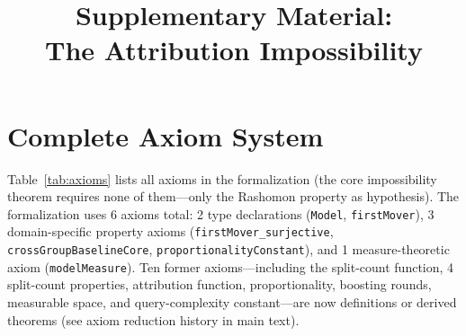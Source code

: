 \documentclass{article}
\title{Supplementary Material:\\The Attribution Impossibility}
\author{}
\date{}
\begin{document}
\maketitle

\setcounter{theorem}{5}    %
\setcounter{axiom}{1}      %
\setcounter{figure}{2}     %
\setcounter{table}{4}      %

\tableofcontents
\newpage

\section{Complete Axiom System}

\begin{sloppypar}
Table~\ref{tab:axioms} lists all axioms in the formalization
(the core impossibility theorem requires none of them---only the Rashomon
property as hypothesis).
The formalization uses 6 axioms total: 2 type declarations
(\texttt{Model}, \texttt{firstMover}), 3 domain-specific property axioms
(\texttt{firstMover\_surjective}, \texttt{crossGroupBaselineCore},
\texttt{proportionalityConstant}), and 1 measure-theoretic axiom
(\texttt{modelMeasure}).
Ten former axioms---including the split-count function, 4 split-count
properties, attribution function, proportionality, boosting rounds,
measurable space, and query-complexity constant---are now definitions or
derived theorems (see axiom reduction history in main text).
\end{sloppypar}
\end{document}

